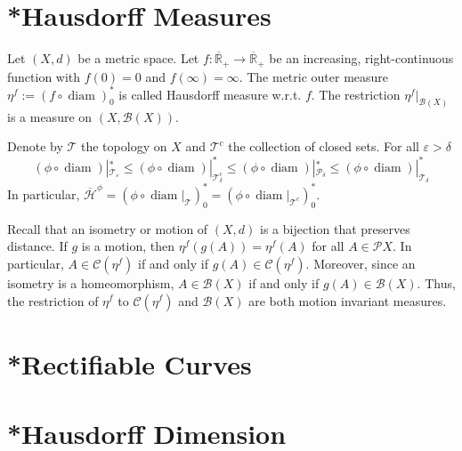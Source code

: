 \documentclass[11pt, a4paper, openany]{book}
\theoremstyle{definition}
\DeclareMathOperator{\diam}{diam}
\begin{document}
\section{*Hausdorff Measures}
    Let $(X,d)$ be a metric space. Let $f:\overline{\mathbb{R}}_+\rightarrow\overline{\mathbb{R}}_+$ be an increasing, right-continuous function with $f(0)=0$ and $f(\infty)=\infty$. The metric outer measure $\eta^f:=(f\circ \diam)^*_0$ is called Hausdorff measure w.r.t. $f$. %
    The restriction $\eta^f|_{\mathscr{B}(X)}$ is a measure on $(X,\mathscr{B}(X))$.
    \begin{lem}
        Denote by $\mathscr{T}$ the topology on $X$ and $\mathscr{T}^c$ the collection of closed sets. For all $\varepsilon>\delta$
        \[(\phi\circ\diam)|_{\mathscr{T}_\varepsilon}^*\leqslant (\phi\circ\diam)|_{\mathscr{T}^c_\delta}^*\leqslant (\phi\circ\diam)|_{\mathscr{P}_\delta}^*\leqslant (\phi\circ\diam)|_{\mathscr{T}_\delta}^*\]
        In particular, $\overline{\mathcal{H}}^\phi=(\phi\circ\diam|_{\mathscr{T}})_0^*=(\phi\circ\diam|_{\mathscr{T}^c})_0^*$.
    \end{lem}
    Recall that an isometry or motion of $(X,d)$ is a bijection that preserves distance. If $g$ is a motion, then $\eta^f(g(A))=\eta^f(A)$ for all $A\in\mathscr{P}X$. In particular, $A\in\mathscr{C}(\eta^f)$ if and only if $g(A)\in\mathscr{C}(\eta^f)$. Moreover, since an isometry is a homeomorphism, $A\in\mathscr{B}(X)$ if and only if $g(A)\in\mathscr{B}(X)$. Thus, the restriction of $\eta^f$ to $\mathscr{C}(\eta^f)$ and $\mathscr{B}(X)$ are both motion invariant measures.
\section{*Rectifiable Curves}
\section{*Hausdorff Dimension}
\end{document}
